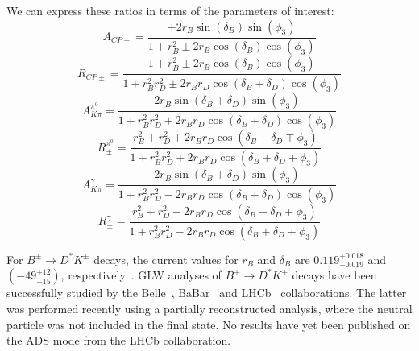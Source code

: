 \documentclass[oneside,12pt]{article}
\begin{document}
We can express these ratios in terms of the parameters of interest:
  \begin{equation}
    A_{CP\pm}=\frac{\pm 2r_{B}\sin(\delta_{B})\sin(\phi_{3})}{1+r_{B}^{2}\pm 2r_{B}\cos(\delta_{B})\cos(\phi_{3})}
    \label{eq:ACP}
  \end{equation}
  \begin{equation}
    R_{CP\pm}=\frac{1 + r_{B}^{2} \pm 2r_{B}\cos(\delta_{B})\cos(\phi_{3})}{1+r_{B}^{2}r_{D}^{2} \pm 2r_{B}r_{D}\cos(\delta_{B}+\delta_{D})\cos(\phi_{3})}
    \label{eq:RCP}
  \end{equation}
  \begin{equation}
    A_{K\pi}^{\pi^{0}}=\frac{2r_{B}\sin(\delta_{B}+\delta_{D})\sin(\phi_{3})}{1+r_{B}^{2}r_{D}^{2}+2r_{B}r_{D}\cos(\delta_{B}+\delta_{D})\cos(\phi_{3})}
    \label{eq:AfavPi0}
  \end{equation}
  \begin{equation}
    R_{\pm}^{\pi^{0}}=\frac{r_{B}^{2} + r_{D}^{2} +
    2r_{B}r_{D}\cos(\delta_{B}-\delta_{D}\mp
    \phi_{3})}{1+r_{B}^{2}r_{D}^{2}+2r_{B}r_{D}\cos(\delta_{B}+\delta_{D}\mp
    \phi_{3})} \label{eq:RPlusMinusPi0}
  \end{equation}
  \begin{equation}
    A_{K\pi}^{\gamma}=\frac{2r_{B}\sin(\delta_{B}+\delta_{D})\sin(\phi_{3})}{1+r_{B}^{2}r_{D}^{2}-2r_{B}r_{D}\cos(\delta_{B}+\delta_{D})\cos(\phi_{3})}
    \label{eq:AfavGamma}
  \end{equation}
  \begin{equation}
    R_{\pm}^{\gamma}=\frac{r_{B}^{2} + r_{D}^{2} -
    2r_{B}r_{D}\cos(\delta_{B}-\delta_{D}\mp
    \phi_{3})}{1+r_{B}^{2}r_{D}^{2}-2r_{B}r_{D}\cos(\delta_{B}+\delta_{D}\mp
    \phi_{3})} \label{eq:RPlusMinusGamma}
  \end{equation}

For $B^{\pm}\rightarrow D^{*}K^{\pm}$ decays, the current values for $r_B$ and
$\delta_B$ are $0.119^{+0.018}_{-0.019}$ and $(-49^{+12}_{-15})$\degree,
respectively~\cite{website:CKMFitter}. GLW analyses of $B^{\pm}\rightarrow
D^{*}K^{\pm}$ decays have been successfully studied by the
Belle~\cite{BelleGLW}, BaBar~\cite{BaBarGLW} and LHCb~\cite{PartReco}
collaborations. The latter was performed recently using a partially
reconstructed analysis, where the neutral particle was not included in the final
state. No results have yet been published on the ADS mode from the LHCb
collaboration.   
\end{document}
